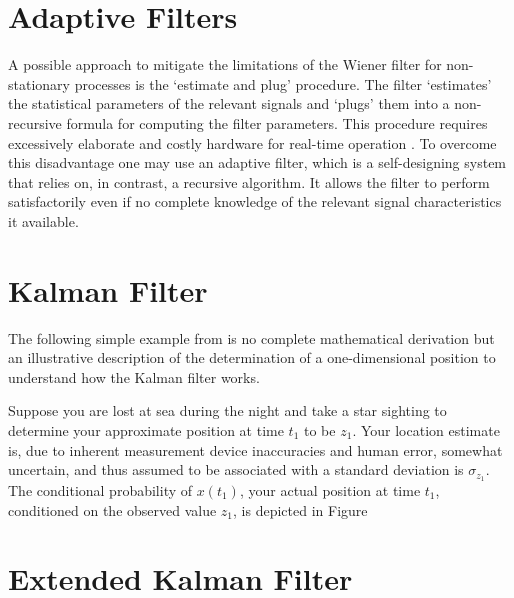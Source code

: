 \section{Adaptive Filters}

A possible approach to mitigate the limitations of the Wiener filter for non-stationary processes is the `estimate and plug' procedure. The filter `estimates' the statistical parameters of the relevant signals and `plugs' them into a non-recursive formula for computing the filter parameters. This procedure requires excessively elaborate and costly hardware for real-time operation \cite{haykin2002adaptive}. To overcome this disadvantage one may use an adaptive filter, which is a self-designing system that relies on, in contrast, a recursive algorithm. It allows the filter to perform satisfactorily even if no complete knowledge of the relevant signal characteristics it available. 


\section{Kalman Filter}

The following simple example from \cite{Maybeck79} is no complete mathematical derivation but an illustrative description of the determination of a one-dimensional position to understand how the Kalman filter works.

Suppose you are lost at sea during the night and take a star sighting to determine your approximate position at time $t_1$ to be $z_1$. Your location estimate is, due to inherent measurement device inaccuracies and human error, somewhat uncertain, and thus assumed to be associated with a standard deviation is $\sigma_{z_1}$. The conditional probability of $x(t_1)$, your actual position at time $t_1$, conditioned on the observed value $z_1$, is depicted in Figure 


\section{Extended Kalman Filter}



